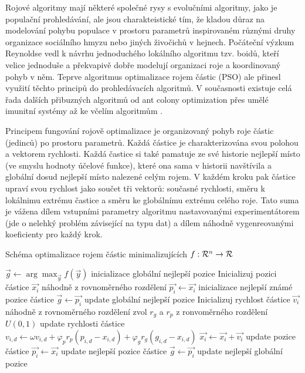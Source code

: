 \documentclass[12pt,fleqn,a4paper,proc]{article}
\newcommand{\Real}{{\cal R}}
\begin{document}
Rojové algoritmy mají některé společné rysy s evolučními algoritmy, jako je populační prohledávání, ale jsou charakteistické tím, že kladou důraz na modelování pohybu populace v prostoru parametrů inspirovaném různými druhy organizace sociálního hmyzu nebo jiných živočichů v hejnech. Počáteční výzkum Reynoldse vedl k návrhu jednoduchého lokálního algoritmu tzv. boidů, kteří velice jednoduše a překvapivě dobře modelují organizaci roje a koordinovaný pohyb v něm. Teprve algoritmus optimalizace rojem částic (PSO) ale přinesl využití těchto principů do prohledávacích algoritmů. V současnosti existuje celá řada dalších přibuzných algoritmů od ant colony optimization přes umělé imunitní systémy až ke včelím algoritmům \cite{swarm}. 

Principem fungování rojově optimalizace je organizovaný pohyb roje částic (jedinců) po prostoru parametrů. Každá částice je charakterizována svou polohou a vektorem rychlosti. Každá častice si také pamatuje ze své historie nejlepší místo (ve smyslu hodnoty účelové funkce), které ona sama v historii navštívila a globální dosud nejlepší místo nalezené celým rojem. V každém kroku pak částice upraví svou rychlost jako součet tři vektorů: současné rychlosti, směru k lokálnimu extrému častice a směru ke globálnímu extrému celého roje. Tato suma je vážena dílem vstupními parametry algoritmu nastavovanými experimentátorem (jde o nelehký problém závisející na typu dat) a dílem náhodně vygenreovanými koeficienty pro každý krok. 

\begin{algorithm}
\caption{Schéma optimalizace rojem částic minimalizujících $f:\Real^n\to\Real$}
\label{obrswarm}
\begin{algorithmic}
\State $\vec{g} \gets \arg\max_{\vec{y}} f(\vec{y})$ \Comment inicializace globální nejlepší pozice
\State Inicializuj pozici částice $\vec{x_i}$ náhodně z rovnoměrného rozdělení
\State $\vec{p_i} \gets \vec{x_i}$ \Comment inicializace nejlepší známé pozice částice
\State $\vec{g} \gets \vec{p_i}$ \Comment update globální nejlepší pozice
\EndIf
\State Inicializuj rychlost částice $\vec{v_i}$ náhodně z rovnoměrného rozdělení
\EndFor
{}
\State 	zvol $r_g$ a $r_p$ z ronvoměrného rozdělení $U(0,1)$
 \Comment update rychlosti částice
\State $v_{i,d} \gets \omega v_{i,d} + \varphi_p r_p (p_{i,d} - x_{i,d}) + \varphi_g r_g (g_{i,d} - x_{i,d})$
\EndFor
\State $\vec{x_i} \gets \vec{x_i} + \vec{v_i}$ \Comment update pozice částice
\State $\vec{p_i} \gets \vec{x_i}$ \Comment update nejlepší pozice částice
\State $\vec{g} \gets \vec{p_i}$ \Comment update nejlepší globální pozice
\EndIf
\EndIf
\EndFor
\EndWhile
\EndProcedure
\end{algorithmic}
\end{algorithm}
\end{document}
